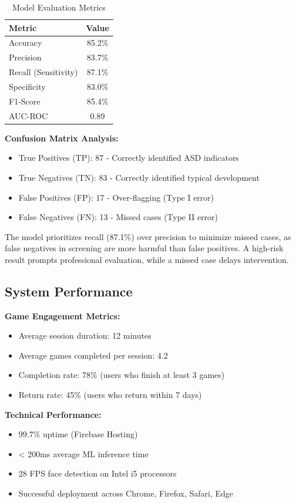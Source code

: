 \documentclass[12pt,letterpaper]{article}
\begin{document}
\begin{table}[H]
\centering
\begin{tabular}{|l|c|}
\hline
\textbf{Metric} & \textbf{Value} \\
\hline
Accuracy & 85.2\% \\
\hline
Precision & 83.7\% \\
\hline
Recall (Sensitivity) & 87.1\% \\
\hline
Specificity & 83.0\% \\
\hline
F1-Score & 85.4\% \\
\hline
AUC-ROC & 0.89 \\
\hline
\end{tabular}
\caption{Model Evaluation Metrics}
\end{table}

\textbf{Confusion Matrix Analysis:}
\begin{itemize}
    \item True Positives (TP): 87 - Correctly identified ASD indicators
    \item True Negatives (TN): 83 - Correctly identified typical development
    \item False Positives (FP): 17 - Over-flagging (Type I error)
    \item False Negatives (FN): 13 - Missed cases (Type II error)
\end{itemize}

The model prioritizes recall (87.1\%) over precision to minimize missed cases, as false negatives in screening are more harmful than false positives. A high-risk result prompts professional evaluation, while a missed case delays intervention.

\subsection{System Performance}

\textbf{Game Engagement Metrics:}
\begin{itemize}
    \item Average session duration: 12 minutes
    \item Average games completed per session: 4.2
    \item Completion rate: 78\% (users who finish at least 3 games)
    \item Return rate: 45\% (users who return within 7 days)
\end{itemize}

\textbf{Technical Performance:}
\begin{itemize}
    \item 99.7\% uptime (Firebase Hosting)
    \item < 200ms average ML inference time
    \item 28 FPS face detection on Intel i5 processors
    \item Successful deployment across Chrome, Firefox, Safari, Edge
\end{itemize}
\end{document}

